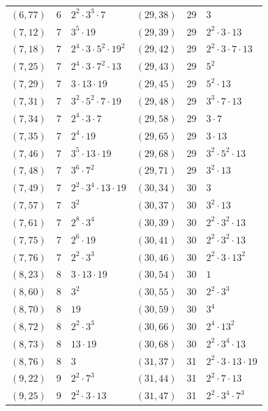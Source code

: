 \documentclass[11pt]{article}
\begin{document}
\begin{longtable}{@{}lrl@{\qquad}lrl@{}}
$(6,77)$ & 6 & $2^{2}\cdot 3^{3}\cdot 7$ & $(29,38)$ & 29 & $3$\\
$(7,12)$ & 7 & $3^{5}\cdot 19$ & $(29,39)$ & 29 & $2^{2}\cdot 3\cdot 13$\\
$(7,18)$ & 7 & $2^{4}\cdot 3\cdot 5^{2}\cdot 19^{2}$ & $(29,42)$ & 29 & $2^{2}\cdot 3\cdot 7\cdot 13$\\
$(7,25)$ & 7 & $2^{4}\cdot 3\cdot 7^{2}\cdot 13$ & $(29,43)$ & 29 & $5^{2}$\\
$(7,29)$ & 7 & $3\cdot 13\cdot 19$ & $(29,45)$ & 29 & $5^{2}\cdot 13$\\
$(7,31)$ & 7 & $3^{2}\cdot 5^{2}\cdot 7\cdot 19$ & $(29,48)$ & 29 & $3^{3}\cdot 7\cdot 13$\\
$(7,34)$ & 7 & $2^{4}\cdot 3\cdot 7$ & $(29,58)$ & 29 & $3\cdot 7$\\
$(7,35)$ & 7 & $2^{4}\cdot 19$ & $(29,65)$ & 29 & $3\cdot 13$\\
$(7,46)$ & 7 & $3^{5}\cdot 13\cdot 19$ & $(29,68)$ & 29 & $3^{2}\cdot 5^{2}\cdot 13$\\
$(7,48)$ & 7 & $3^{6}\cdot 7^{2}$ & $(29,71)$ & 29 & $3^{2}\cdot 13$\\
$(7,49)$ & 7 & $2^{2}\cdot 3^{4}\cdot 13\cdot 19$ & $(30,34)$ & 30 & $3$\\
$(7,57)$ & 7 & $3^{2}$ & $(30,37)$ & 30 & $3^{2}\cdot 13$\\
$(7,61)$ & 7 & $2^{8}\cdot 3^{4}$ & $(30,39)$ & 30 & $2^{2}\cdot 3^{2}\cdot 13$\\
$(7,75)$ & 7 & $2^{6}\cdot 19$ & $(30,41)$ & 30 & $2^{2}\cdot 3^{2}\cdot 13$\\
$(7,76)$ & 7 & $2^{2}\cdot 3^{3}$ & $(30,46)$ & 30 & $2^{2}\cdot 3\cdot 13^{2}$\\
$(8,23)$ & 8 & $3\cdot 13\cdot 19$ & $(30,54)$ & 30 & $1$\\
$(8,60)$ & 8 & $3^{2}$ & $(30,55)$ & 30 & $2^{2}\cdot 3^{3}$\\
$(8,70)$ & 8 & $19$ & $(30,59)$ & 30 & $3^{4}$\\
$(8,72)$ & 8 & $2^{2}\cdot 3^{3}$ & $(30,66)$ & 30 & $2^{4}\cdot 13^{2}$\\
$(8,73)$ & 8 & $13\cdot 19$ & $(30,68)$ & 30 & $2^{2}\cdot 3^{4}\cdot 13$\\
$(8,76)$ & 8 & $3$ & $(31,37)$ & 31 & $2^{2}\cdot 3\cdot 13\cdot 19$\\
$(9,22)$ & 9 & $2^{2}\cdot 7^{3}$ & $(31,44)$ & 31 & $2^{2}\cdot 7\cdot 13$\\
$(9,25)$ & 9 & $2^{2}\cdot 3\cdot 13$ & $(31,47)$ & 31 & $2^{2}\cdot 3^{4}\cdot 7^{3}$\\

\end{longtable}
\end{document}

